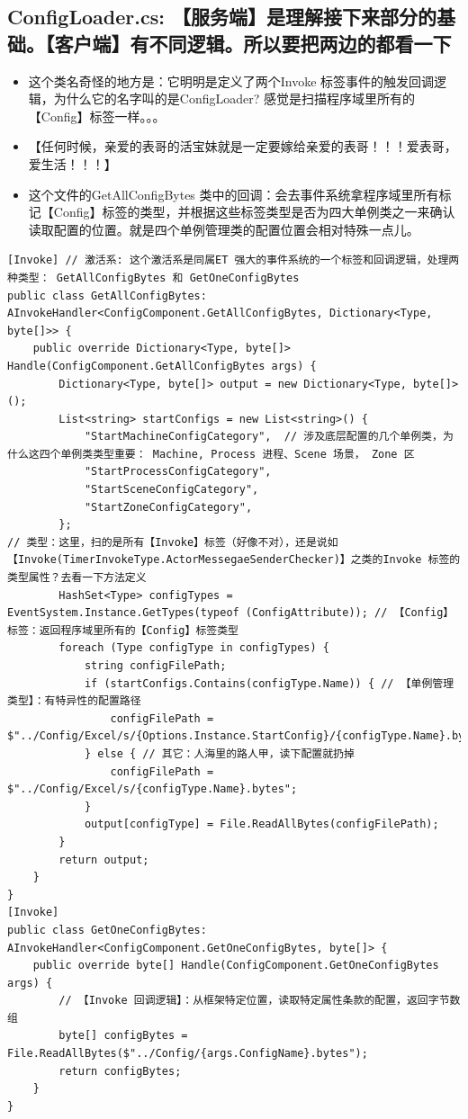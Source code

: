 \documentclass[9pt, b5paper]{article}
\begin{document}
\subsection{ConfigLoader.cs: 【服务端】是理解接下来部分的基础。【客户端】有不同逻辑。所以要把两边的都看一下}
\label{sec-1-5}
\begin{itemize}
\item 这个类名奇怪的地方是：它明明是定义了两个Invoke 标签事件的触发回调逻辑，为什么它的名字叫的是ConfigLoader? 感觉是扫描程序域里所有的【Config】标签一样。。。
\item 【任何时候，亲爱的表哥的活宝妹就是一定要嫁给亲爱的表哥！！！爱表哥，爱生活！！！】
\item 这个文件的GetAllConfigBytes 类中的回调：会去事件系统拿程序域里所有标记【Config】标签的类型，并根据这些标签类型是否为四大单例类之一来确认读取配置的位置。就是四个单例管理类的配置位置会相对特殊一点儿。
\end{itemize}
\begin{verbatim}
[Invoke] // 激活系: 这个激活系是同属ET 强大的事件系统的一个标签和回调逻辑，处理两种类型： GetAllConfigBytes 和 GetOneConfigBytes
public class GetAllConfigBytes: AInvokeHandler<ConfigComponent.GetAllConfigBytes, Dictionary<Type, byte[]>> {
    public override Dictionary<Type, byte[]> Handle(ConfigComponent.GetAllConfigBytes args) {
        Dictionary<Type, byte[]> output = new Dictionary<Type, byte[]>();
        List<string> startConfigs = new List<string>() {
            "StartMachineConfigCategory",  // 涉及底层配置的几个单例类，为什么这四个单例类类型重要： Machine, Process 进程、Scene 场景， Zone 区
            "StartProcessConfigCategory", 
            "StartSceneConfigCategory", 
            "StartZoneConfigCategory",
        };
// 类型：这里，扫的是所有【Invoke】标签（好像不对），还是说如【Invoke(TimerInvokeType.ActorMessegaeSenderChecker)】之类的Invoke 标签的类型属性？去看一下方法定义
        HashSet<Type> configTypes = EventSystem.Instance.GetTypes(typeof (ConfigAttribute)); // 【Config】标签：返回程序域里所有的【Config】标签类型
        foreach (Type configType in configTypes) {
            string configFilePath;
            if (startConfigs.Contains(configType.Name)) { // 【单例管理类型】：有特异性的配置路径
                configFilePath = $"../Config/Excel/s/{Options.Instance.StartConfig}/{configType.Name}.bytes";    
            } else { // 其它：人海里的路人甲，读下配置就扔掉
                configFilePath = $"../Config/Excel/s/{configType.Name}.bytes";
            }
            output[configType] = File.ReadAllBytes(configFilePath);
        }
        return output;
    }
}
[Invoke]
public class GetOneConfigBytes: AInvokeHandler<ConfigComponent.GetOneConfigBytes, byte[]> {
    public override byte[] Handle(ConfigComponent.GetOneConfigBytes args) {
        // 【Invoke 回调逻辑】：从框架特定位置，读取特定属性条款的配置，返回字节数组
        byte[] configBytes = File.ReadAllBytes($"../Config/{args.ConfigName}.bytes");
        return configBytes;
    }
}
\end{verbatim}
\end{document}
